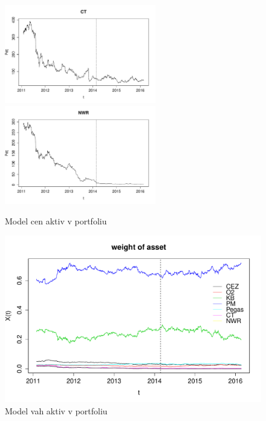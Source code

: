\documentclass[a4paper,12pt]{report}
\theoremstyle{definition} \newtheorem{definice}[veta]{Definice}
\theoremstyle{remark}
\begin{document}
\begin{figure}[!htbp]
	\includegraphics[width=6.6cm, clip, trim= 0 15 25 0]{IMG/ds_ct_v4.pdf}\\
	\includegraphics[width=6.6cm, clip, trim= 0 15 25 0]{IMG/ds_nwr_v4.pdf}	
  \caption{Model cen aktiv v portfoliu}  \label{price_of_asset}
\end{figure}

\begin{figure}[!htbp]
  \centering 
	\includegraphics[width=13.5cm, clip, trim= 0 15 25 50]{IMG/ds_weight_of_asset_v5.pdf}
  \caption{Model vah aktiv v portfoliu}  \label{weight_of_asset}
\end{figure}
\end{document}

